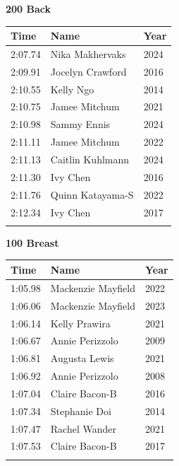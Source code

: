 \vspace{1.2em}
\noindent\begin{minipage}[t]{0.48\textwidth}
\centering
\textbf{\textcolor{teamprimary}{200 Back}}\par
\vspace{0.5em}
\centering
\small
\renewcommand{\arraystretch}{1.0}
\setlength{\tabcolsep}{4pt}
\begin{tabular}{@{}p{1.8cm}p{3.0cm}p{1.0cm}@{}}
\toprule
\textbf{Time} & \textbf{Name} & \textbf{Year} \\
\midrule
2:07.74 & Nika Makhervaks & 2024 \\
2:09.91 & Jocelyn Crawford & 2016 \\
2:10.55 & Kelly Ngo & 2014 \\
2:10.75 & Jamee Mitchum & 2021 \\
2:10.98 & Sammy Ennis & 2024 \\
2:11.11 & Jamee Mitchum & 2022 \\
2:11.13 & Caitlin Kuhlmann & 2024 \\
2:11.30 & Ivy Chen & 2016 \\
2:11.76 & Quinn Katayama-S & 2022 \\
2:12.34 & Ivy Chen & 2017 \\
\bottomrule
\vspace{0.5em}
\end{tabular}
\end{minipage}
\hfill
\begin{minipage}[t]{0.48\textwidth}
\centering
\textbf{\textcolor{teamprimary}{100 Breast}}\par
\vspace{0.5em}
\centering
\small
\renewcommand{\arraystretch}{1.0}
\setlength{\tabcolsep}{4pt}
\begin{tabular}{@{}p{1.8cm}p{3.0cm}p{1.0cm}@{}}
\toprule
\textbf{Time} & \textbf{Name} & \textbf{Year} \\
\midrule
1:05.98 & Mackenzie Mayfield & 2022 \\
1:06.06 & Mackenzie Mayfield & 2023 \\
1:06.14 & Kelly Prawira & 2021 \\
1:06.67 & Annie Perizzolo & 2009 \\
1:06.81 & Augusta Lewis & 2021 \\
1:06.92 & Annie Perizzolo & 2008 \\
1:07.04 & Claire Bacon-B & 2016 \\
1:07.34 & Stephanie Doi & 2014 \\
1:07.47 & Rachel Wander & 2021 \\
1:07.53 & Claire Bacon-B & 2017 \\
\bottomrule
\vspace{0.5em}
\end{tabular}
\end{minipage}
